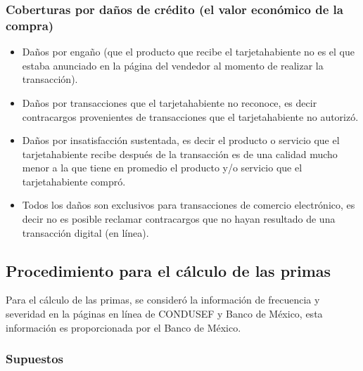 \documentclass{article}
\begin{document}
\subsubsection*{Coberturas por daños de crédito (el valor económico de la compra)}
\begin{itemize}
    \item Daños por engaño (que el producto que recibe el tarjetahabiente no es el que estaba anunciado en la página del vendedor al momento de realizar la transacción).
    \item Daños por transacciones que el tarjetahabiente no reconoce, es decir contracargos provenientes de transacciones que el tarjetahabiente no autorizó.
    \item Daños por insatisfacción sustentada, es decir el producto o servicio que el tarjetahabiente recibe después de la transacción es de una calidad mucho menor a la que tiene en promedio el producto y/o servicio que el tarjetahabiente compró.
    \item Todos los daños son exclusivos para transacciones de comercio electrónico, es decir no es posible reclamar contracargos que no hayan resultado de una transacción digital (en línea).

\end{itemize}
\newpage
\subsection*{Procedimiento para el cálculo de las primas}
Para el cálculo de las primas, se consideró la información de frecuencia y severidad en la páginas en línea de CONDUSEF y Banco de México, esta información es proporcionada por el Banco de México. 
\subsubsection*{Supuestos} 
\end{document}
